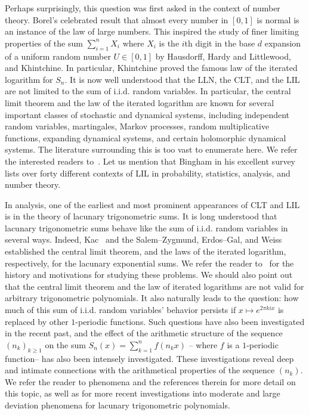 \documentclass[12pt, reqno, final, a4paper]{amsart}
\theoremstyle{plain}
\theoremstyle{definition}
\theoremstyle{remark}
\newcommand{\1}{\mathbf 1}
\begin{document}
Perhaps surprisingly, this question was first asked in the context of number theory. Borel's celebrated result that almost every number in $[0, 1]$ is normal is an instance of the law of large numbers. This inspired the study of finer limiting properties of the sum $\sum_{i=1}^{n}X_i$ where $X_i$ is the $i$th digit in the base $d$ expansion of a uniform random number $U\in [0, 1]$ by Hausdorff, Hardy and Littlewood, and Khintchine. In particular, Khintchine proved the famous law of the iterated logarithm for $S_n$. It is now well understood that the LLN, the CLT, and the LIL are not limited to the sum of i.i.d. random variables. In particular, the central limit theorem and the law of the iterated logarithm are known for several important classes of stochastic and dynamical systems, including independent random variables, martingales, Markov processes, random multiplicative functions, expanding dynamical systems, and certain holomorphic dynamical systems. The literature surrounding this is too vast to enumerate here. We refer the interested readers to~\cite{Stout74, Bingham, HH80}. Let us mention that Bingham in his excellent survey~\cite[Section 18--20]{Bingham} lists over forty different contexts of LIL in probability, statistics, analysis, and number theory. 

In analysis, one of the earliest and most prominent appearances of CLT and LIL is in the theory of lacunary trigonometric sums. It is long understood that lacunary trigonometric sums behave like the sum of i.i.d. random variables in several ways. Indeed, Kac~\cite{Kac49} and the Salem--Zygmund, Erdos--Gal, and Weiss~\cite{SalemZygmund1950, ErdosGal1955, Weiss1959} established the central limit theorem, and the laws of the iterated logarithm, respectively, for the lacunary exponential sums. We refer the reader to~\cite{AistleitnerBerkesTichy2023} for the history and motivations for studying these problems. We should also point out that the central limit theorem and the law of iterated logarithms are not valid for arbitrary trigonometric polynomials. It also naturally leads to the question: how much of this sum of i.i.d. random variables' behavior persists if $x\mapsto e^{2\pi k ix}$ is replaced by other $1$-periodic functions. Such questions have also been investigated in the recent past, and the effect of the arithmetic structure of the sequence $(n_k)_{k\geq 1}$ on the sum $S_n(x)=\sum_{k=1}^{n}f(n_k x)$ -- where $f$ is a $1$-periodic function-- has also been intensely investigated. These investigations reveal deep and intimate connections with the arithmetical properties of the sequence $(n_k)$. We refer the reader to phenomena\cite{AistleitnerGantertKabluchkoProchnoRamanan2023, AistleitnerFruehwirthHaukeManskova2025, AistleitnerBerkesTichy2023} and the references therein for more detail on this topic, as well as for more recent investigations into moderate and large deviation phenomena for lacunary trigonometric polynomials. 
\end{document}
